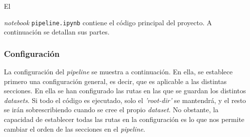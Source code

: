 El {\textit{notebook} \texttt{pipeline.ipynb} contiene el código principal del proyecto. A continuación se detallan sus partes.

\subsubsection{Configuración}

La configuración del \textit{pipeline} se muestra a continuación. En ella, se establece primero una configuración general, es decir, que es aplicable a
las distintas secciones. En ella se han configurado las rutas en las que se guardan los distintos \textit{datasets}. Si todo el código es ejecutado, solo el
\textit{'root-dir'} se mantendrá, y el resto se irán sobrescribiendo cuando se cree el propio \textit{dataset}. No obstante, la capacidad de establecer todas
las rutas en la configuración es lo que nos permite cambiar el orden de las secciones en el \textit{pipeline}. 

}
